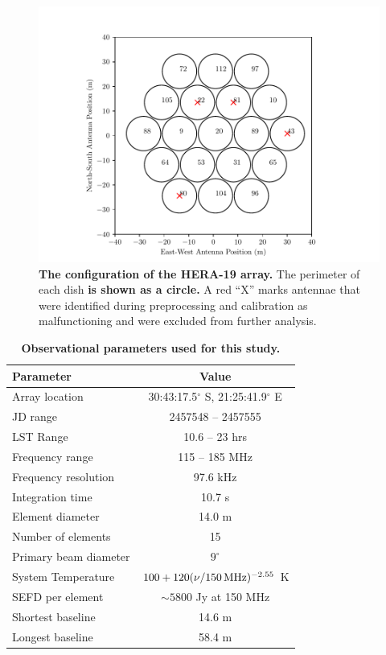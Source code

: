 \documentclass[twocolumn, trackchanges]{aastex61}
\newcommand{\edited}[1]{{\bf \color{red} #1}}
\begin{document}
\begin{figure}
\centering
\hspace{-0.5cm}\includegraphics[scale=0.6]{antpos_hera19.pdf}
\caption{\edited{The configuration of the HERA-19 array.} The perimeter of each dish \edited{is shown as a circle.} 
A red ``X'' marks antennae that were identified during preprocessing and calibration as malfunctioning and were excluded from further analysis.}
\label{fig:antpos}
\end{figure}


\begin{table}
\centering
\caption{\edited{Observational parameters used for this study.}}
\begin{tabular}{lc}
\hline
Parameter & Value \\
\hline
Array location & 30:43:17.5$^\circ$ S, 21:25:41.9$^\circ$ E \\
JD range & 2457548 -- 2457555 \\
LST Range & 10.6 -- 23 hrs \\
Frequency range & 115 -- 185 MHz \\
Frequency resolution & 97.6 kHz \\
Integration time & 10.7 s\\
Element diameter & 14.0 m\\
Number of elements & 15 \\
Primary beam diameter & $9^{\circ}$ \\
System Temperature & $100 + 120(\nu / 150\,{\rm MHz})^{-2.55}$ K\\
SEFD per element & $\sim 5800$ Jy at 150 MHz\\
Shortest baseline & 14.6 m \\
Longest baseline & 58.4 m \\
\hline
\end{tabular}
\label{tab:params}
\end{table}
\end{document}
